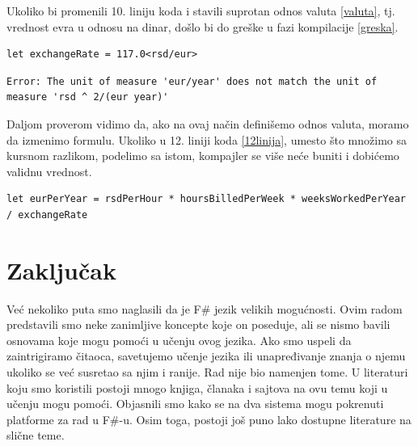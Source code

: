 \documentclass[a4paper]{article}
\begin{document}
Ukoliko bi promenili 10. liniju koda i stavili suprotan odnos valuta \ref{valuta}, tj. vrednost evra u odnosu na dinar, došlo bi do greške u fazi kompilacije \ref{greska}. \\
 
\begin{lstlisting}[caption={Promenjen odnos valuta},frame=single, firstnumber=10, label = valuta]
let exchangeRate = 117.0<rsd/eur>
\end{lstlisting}
\begin{lstlisting}[caption={Kompajler prepoznaje grešku},frame=single, label=greska]
Error: The unit of measure 'eur/year' does not match the unit of measure 'rsd ^ 2/(eur year)'
\end{lstlisting}

Daljom proverom vidimo da, ako na ovaj način definišemo odnos valuta, moramo da izmenimo formulu. Ukoliko u 12. liniji koda \ref{12linija}, umesto što množimo sa kursnom razlikom, podelimo sa istom, kompajler se više neće buniti i dobićemo validnu vrednost. \\

\begin{lstlisting}[caption={Ispravljena linija},frame=single, firstnumber=12,label={12linija}]
let eurPerYear = rsdPerHour * hoursBilledPerWeek * weeksWorkedPerYear / exchangeRate
\end{lstlisting}

\section{Zaključak}
\label{sec:zakljucak}

Već nekoliko puta smo naglasili da je F\# jezik velikih mogućnosti. Ovim radom predstavili smo neke zanimljive koncepte koje on poseduje, ali se nismo bavili osnovama koje mogu pomoći u učenju ovog jezika. Ako smo uspeli da zaintrigiramo čitaoca, savetujemo učenje jezika ili unapređivanje znanja o njemu ukoliko se već susretao sa njim i ranije. Rad nije bio namenjen tome. U literaturi koju smo koristili postoji mnogo knjiga, članaka i sajtova na ovu temu koji u učenju mogu pomoći. Objasnili smo kako se na dva sistema mogu pokrenuti platforme za rad u F\#-u. Osim toga, postoji još puno lako dostupne literature na slične teme.

\appendix
 

\end{document}
